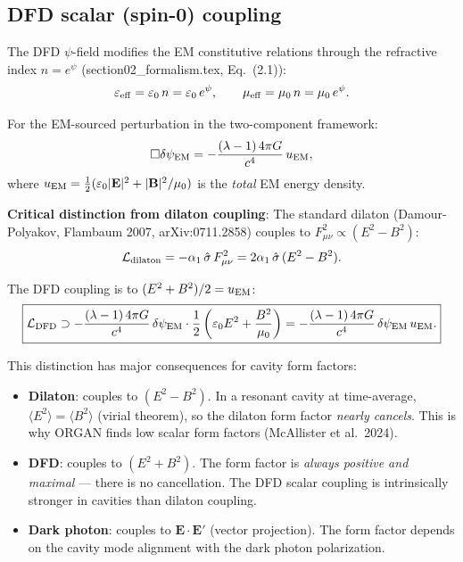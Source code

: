 \documentclass[11pt]{article}
\newcommand{\lam}{\lambda}
\newcommand{\dpsiEM}{\delta\psi_{\rm EM}}
\theoremstyle{definition}
\theoremstyle{remark}
\begin{document}
\subsection{DFD scalar (spin-0) coupling}

The DFD $\psi$-field modifies the EM constitutive relations through the
refractive index $n = e^\psi$ (section02\_formalism.tex, Eq.~(2.1)):
\begin{equation}
\varepsilon_{\rm eff} = \varepsilon_0\,n = \varepsilon_0\,e^\psi, \qquad
\mu_{\rm eff} = \mu_0\,n = \mu_0\,e^\psi.
\label{eq:constitutive}
\end{equation}

For the EM-sourced perturbation in the two-component framework:
\begin{equation}
\Box\dpsiEM = -\frac{(\lam-1)\,4\pi G}{c^4}\,u_{\rm EM},
\label{eq:psi_source}
\end{equation}
where $u_{\rm EM} = \frac{1}{2}(\varepsilon_0|\mathbf{E}|^2 +
|\mathbf{B}|^2/\mu_0)$ is the \emph{total} EM energy density.

\textbf{Critical distinction from dilaton coupling}: The standard dilaton
(Damour-Polyakov, Flambaum 2007, arXiv:0711.2858) couples to
$F_{\mu\nu}^2 \propto (E^2 - B^2)$:
\begin{equation}
\mathcal{L}_{\rm dilaton} = -\alpha_1\,\hat{\sigma}\,F_{\mu\nu}^2
= 2\alpha_1\,\hat{\sigma}\,(E^2 - B^2).
\label{eq:L_dilaton}
\end{equation}

The DFD coupling is to $(E^2 + B^2)/2 = u_{\rm EM}$:
\begin{equation}
\boxed{
\mathcal{L}_{\rm DFD} \supset -\frac{(\lam-1)\,4\pi G}{c^4}\,\dpsiEM
\cdot\frac{1}{2}\left(\varepsilon_0 E^2 + \frac{B^2}{\mu_0}\right)
= -\frac{(\lam-1)\,4\pi G}{c^4}\,\dpsiEM\,u_{\rm EM}.
}
\label{eq:L_DFD}
\end{equation}

This distinction has major consequences for cavity form factors:
\begin{itemize}[nosep]
\item \textbf{Dilaton}: couples to $(E^2 - B^2)$. In a resonant cavity
  at time-average, $\langle E^2\rangle = \langle B^2\rangle$ (virial
  theorem), so the dilaton form factor \emph{nearly cancels}. This is
  why ORGAN finds low scalar form factors (McAllister et al.\ 2024).
\item \textbf{DFD}: couples to $(E^2 + B^2)$. The form factor is
  \emph{always positive and maximal} --- there is no cancellation.
  The DFD scalar coupling is intrinsically stronger in cavities than
  dilaton coupling.
\item \textbf{Dark photon}: couples to $\mathbf{E}\cdot\mathbf{E}'$
  (vector projection). The form factor depends on the cavity mode
  alignment with the dark photon polarization.
\end{itemize}
\end{document}
